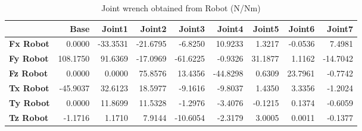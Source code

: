 \begin{table}[h!]
	\centering
	\caption{Joint wrench obtained from Robot (N/Nm)}
	\label{wrech_Robot_Pose10}
	\begin{tabular}{|l|r|r|r|r|r|r|r|r|}
		\hline
		\textbf{} & \textbf{Base} & \textbf{Joint1}  & \textbf{Joint2}  & \textbf{Joint3}  & \textbf{Joint4}  & \textbf{Joint5}  & \textbf{Joint6}  & \textbf{Joint7} \\ \hline
		\textbf{Fx Robot}  & 0.0000        & -33.3531        & -21.6795        & -6.8250        & 10.9233        & 1.3217        & -0.0536        & 7.4981 \\ \hline
		\textbf{Fy Robot}  & 108.1750        & 91.6369        & -17.0969        & -61.6225        & -0.9326        & 31.1877        & 1.1162        & -14.7042 \\ \hline
		\textbf{Fz Robot}  & 0.0000        & 0.0000        & 75.8576        & 13.4356        & -44.8298        & 0.6309        & 23.7961        & -0.7742 \\ \hline
		\textbf{Tx Robot}  & -45.9037        & 32.6123        & 18.5977        & -9.1616        & -9.8037        & 1.4350        & 3.3356        & -1.2024 \\ \hline
		\textbf{Ty Robot}  & 0.0000        & 11.8699        & 11.5328        & -1.2976        & -3.4076        & -0.1215        & 0.1374        & -0.6059 \\ \hline
		\textbf{Tz Robot}  & -1.1716        & 1.1710        & 7.9144        & -10.6054        & -2.3179        & 3.0005        & 0.0011        & -0.1377 \\ \hline
	\end{tabular}
\end{table}

